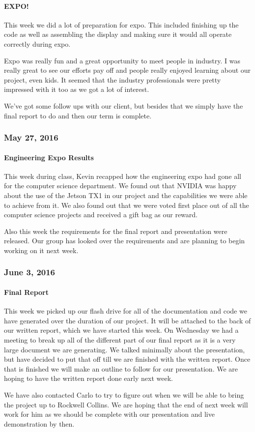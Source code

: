 \paragraph{EXPO!}
This week we did a lot of preparation for expo. This included finishing up the code as well as assembling the display and making sure it would all operate correctly during expo.
\par
Expo was really fun and a great opportunity to meet people in industry. I was really great to see our efforts pay off and people really enjoyed learning about our project, even kids. It seemed that the industry professionals were pretty impressed with it too as we got a lot of interest.
\par
We've got some follow ups with our client, but besides that we simply have the final report to do and then our term is complete.\\

\subsubsection{May 27, 2016}
\paragraph{Engineering Expo Results}
This week during class, Kevin recapped how the engineering expo had gone all for the computer science department. We found out that NVIDIA was happy about the use of the Jetson TX1 in our project and the capabilities we were able to achieve from it. We also found out that we were voted first place out of all the computer science projects and received a gift bag as our reward. 
\par
Also this week the requirements for the final report and presentation were released. Our group has looked over the requirements and are planning to begin working on it next week.\\

\subsubsection{June 3, 2016}
\paragraph{Final Report}
This week we picked up our flash drive for all of the documentation and code we have generated over the duration of our project. It will be attached to the back of our written report, which we have started this week. On Wednesday we had a meeting to break up all of the different part of our final report as it is a very large document we are generating. We talked minimally about the presentation, but have decided to put that off till we are finished with the written report. Once that is finished we will make an outline to follow for our presentation. We are hoping to have the written report done early next week.
\par
We have also contacted Carlo to try to figure out when we will be able to bring the project up to Rockwell Collins. We are hoping that the end of next week will work for him as we should be complete with our presentation and live demonstration by then.